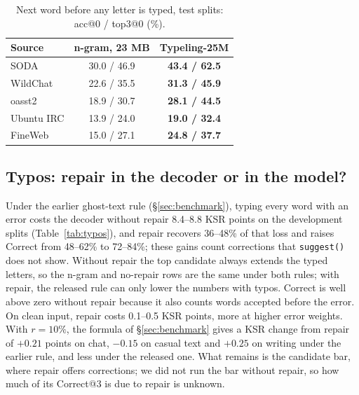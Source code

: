 \documentclass[11pt]{article}
\begin{document}
\begin{table}[t]
\centering
\small
\begin{tabular}{@{}lcc@{}}
\toprule
Source & n-gram, 23 MB & Typeling-25M \\
\midrule
SODA & 30.0 / 46.9 & \textbf{43.4 / 62.5} \\
WildChat & 22.6 / 35.5 & \textbf{31.3 / 45.9} \\
oasst2 & 18.9 / 30.7 & \textbf{28.1 / 44.5} \\
Ubuntu IRC & 13.9 / 24.0 & \textbf{19.0 / 32.4} \\
FineWeb & 15.0 / 27.1 & \textbf{24.8 / 37.7} \\
\bottomrule
\end{tabular}
\caption{Next word before any letter is typed, test splits: acc@0 / top3@0 (\%).}
\label{tab:nextword}
\end{table}

\subsection{Typos: repair in the decoder or in the model?}

Under the earlier ghost-text rule (\S\ref{sec:benchmark}), typing every word with an error costs the decoder without
repair 8.4--8.8 KSR points on the development splits (Table~\ref{tab:typos}), and repair recovers 36--48\% of that
loss and raises Correct from 48--62\% to 72--84\%; these gains count corrections that \texttt{suggest()} does not
show. Without repair the top candidate always extends the typed letters, so the n-gram and no-repair rows are the
same under both rules; with repair, the released rule can only lower the numbers with typos. Correct is well above
zero without repair because it also counts words accepted before the error. On clean input, repair costs 0.1--0.5
KSR points, more at higher error weights. With $r = 10\%$, the formula of \S\ref{sec:benchmark} gives a KSR change
from repair of $+0.21$ points on chat, $-0.15$ on casual text and $+0.25$ on writing under the earlier rule, and
less under the released one. What remains is the candidate bar, where repair offers corrections; we did not run the
bar without repair, so how much of its Correct@3 is due to repair is unknown.
\end{document}
